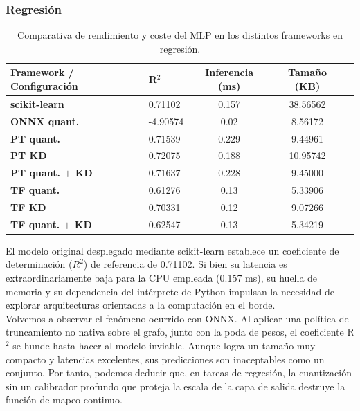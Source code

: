 \documentclass[a4paper,12pt,twoside,final]{book}
\begin{document}
\subsubsection{Regresión}
\begin{table}[htbp]
  \centering
  \begin{tabularx}{\textwidth}{lXccc}
    \hline
    \textbf{Framework / Configuración} & \textbf{R$^2$} & \textbf{Inferencia (ms)} & \textbf{Tamaño (KB)} \\
    \hline
    \textbf{scikit-learn}     & 0.71102  & 0.157 & 38.56562 \\
    \hline
    \textbf{ONNX quant.}      & -4.90574 & 0.02  & 8.56172  \\
    \hline
    \textbf{PT quant.}        & 0.71539  & 0.229 & 9.44961  \\
    \textbf{PT KD}            & 0.72075  & 0.188 & 10.95742 \\
    \textbf{PT quant. $+$ KD} & 0.71637  & 0.228 & 9.45000  \\
    \hline
    \textbf{TF quant.}        & 0.61276  & 0.13  & 5.33906  \\
    \textbf{TF KD}            & 0.70331  & 0.12  & 9.07266  \\
    \textbf{TF quant. $+$ KD} & 0.62547  & 0.13  & 5.34219  \\
    \hline
  \end{tabularx}
  \caption{Comparativa de rendimiento y coste del MLP en los distintos frameworks en regresión.}
  \label{tab:mlp_reg_resumen}
\end{table}
El modelo original desplegado mediante scikit-learn establece un coeficiente de determinación ($R^2$) de referencia de
0.71102. Si bien su latencia es extraordinariamente baja para la CPU empleada (0.157 ms), su huella de
memoria y su dependencia del intérprete de Python impulsan la necesidad de explorar arquitecturas orientadas a la
computación en el borde.\\

Volvemos a observar el fenómeno ocurrido con ONNX. Al aplicar una política de truncamiento no nativa sobre el grafo,
junto con la poda de pesos, el coeficiente R$^2$ se hunde hasta hacer al modelo inviable. Aunque logra un tamaño
muy compacto y latencias excelentes, sus predicciones son inaceptables como un conjunto. Por tanto, podemos deducir que,
en tareas de regresión, la cuantización sin un calibrador profundo que proteja la escala de la capa de salida destruye
la función de mapeo continuo.\\
\end{document}
